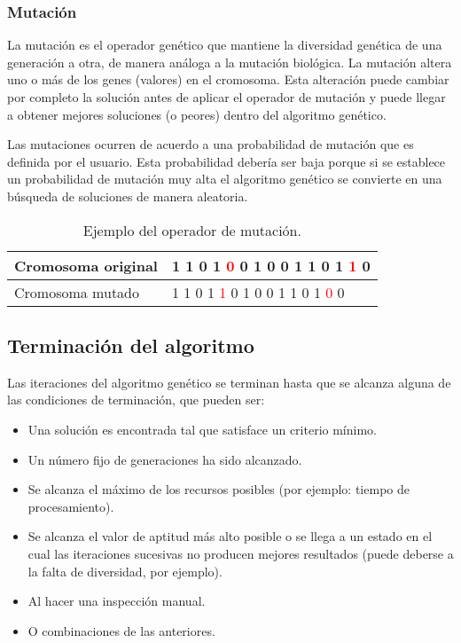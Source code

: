 \subsubsection{Mutaci\'on}

La mutación es el operador genético que mantiene la diversidad genética de una generación a otra, de manera análoga a la mutación biológica. La mutación altera uno o más de los genes (valores) en el cromosoma. Esta alteración puede cambiar por completo la solución antes de aplicar el operador de mutación y puede llegar a obtener mejores soluciones (o peores) dentro del algoritmo genético.\par

Las mutaciones ocurren de acuerdo a una probabilidad de mutación que es definida por el usuario. Esta probabilidad debería ser baja porque si se establece un probabilidad de mutación muy alta el algoritmo genético se convierte en una búsqueda de soluciones de manera aleatoria.

\begin{table}[H]
  \centering
  \begin{tabular}{|l|l|}
  \hline
  Cromosoma original & 1 1 0 1 \textcolor{red}{0} 0 1 0 0 1 1 0 1 \textcolor{red}{1} 0  \\ \hline
  Cromosoma mutado   & 1 1 0 1 \textcolor{red}{1} 0 1 0 0 1 1 0 1 \textcolor{red}{0} 0  \\ \hline
  \end{tabular}
  \caption{Ejemplo del operador de mutación.}
\end{table}

\subsection{Terminaci\'on del algoritmo}

Las iteraciones del algoritmo genético se terminan hasta que se alcanza alguna de las condiciones de terminación, que pueden ser:

\begin{itemize}
  \item Una solución es encontrada tal que satisface un criterio mínimo.
  \item Un número fijo de generaciones ha sido alcanzado.
  \item Se alcanza el máximo de los recursos posibles (por ejemplo: tiempo de procesamiento).
  \item Se alcanza el valor de aptitud más alto posible o se llega a un estado en el cual las iteraciones sucesivas no producen mejores resultados (puede deberse a la falta de diversidad, por ejemplo).
  \item Al hacer una inspección manual.
  \item O combinaciones de las anteriores.
\end{itemize}


